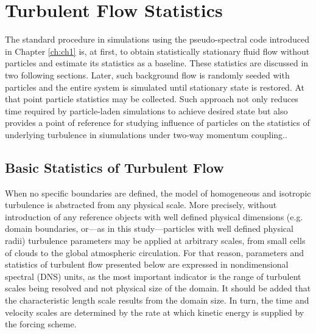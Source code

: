 \documentclass{pracamgren}
\begin{document}
\section{Turbulent Flow Statistics}
\label{sc:ch2.flow}

The standard procedure in simulations using the pseudo-spectral code introduced in Chapter \ref{ch:ch1} is, at first, to obtain statistically stationary fluid flow without particles and estimate its statistics as a baseline.
These statistics are discussed in two following sections.
Later, such background flow is randomly seeded with particles and the entire system is simulated until stationary state is restored.
At that point particle statistics may be collected.
Such approach not only reduces time required by particle-laden simulations to achieve desired state but also provides a point of reference for studying influence of particles on the statistics of underlying turbulence in siumulations under two-way momentum coupling..



\subsection{Basic Statistics of Turbulent Flow}
\label{ssc:ch2.flow.bstat}

When no specific boundaries are defined, the model of homogeneous and isotropic turbulence is abstracted from any physical scale. 
More precisely, without introduction of any reference objects with well defined physical dimensions (e.g. domain boundaries, or---as in this study---particles with well defined physical radii) turbulence parameters may be applied at arbitrary scales, from small cells of clouds to the global atmospheric circulation.
For that reason, parameters and statistics of turbulent flow presented below are expressed in nondimensional spectral (DNS) units, as the most important indicator is the range of turbulent scales being resolved and not physical size of the domain.
It should be added that the characteristic length scale results from the domain size. 
In turn, the time and velocity scales are determined by the rate at which kinetic energy is supplied by the forcing scheme.
\end{document}
